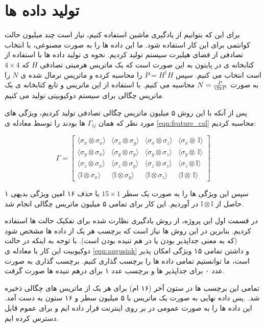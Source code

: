 \section{تولید داده ها}

برای این که بتوانیم از یادگیری ماشین استفاده کنیم، نیاز است چند میلیون حالت کوانتمی برای این کار استفاده شود.
ما این داده ها را به صورت مصنوعی، با انتخاب تصادفی از فضای هیلبرت سیستم تولید کردیم.
نحوه ی تولید داده ها با استفاده از کتابخانه ی
در پایتون به این صورت است که
یک ماتریس هرمیتی
تصادفی
$H$
که
$4\times 4$
است
انتخاب می کنیم. سپس
$P=H^\dag H$
را محاسبه کرده و ماتریس نرمال شده ی
$N$
را به صورت
$N = \frac{P}{\Tr P}$
محاسبه می کنیم.
با استفاده از این ماتریس و تابع
کتابخانه ی
یک ماتریس چگالی برای سیستم دوکیوبیتی تولید می کنیم.

پس از آنکه با این روش ۵ میلیون ماتریس چگالی تصادفی تولید کردیم، ویژگی های مورد نظر که همان
$\Gamma_{ij}$
ها بودند را توسط معادله ی
\ref{eqn:feature_cal}
محاسبه کردیم:

\[
   \Gamma =
  \left[ {\begin{array}{cccc}
\langle\sigma_x\otimes\sigma_x\rangle & \langle\sigma_x\otimes\sigma_y\rangle & \langle\sigma_x\otimes\sigma_z\rangle & \langle\sigma_x\otimes\ \mathbb{I}\rangle
\\ \langle\sigma_y\otimes\sigma_x\rangle & \langle\sigma_y\otimes\sigma_y\rangle & \langle\sigma_y\otimes\sigma_z\rangle & \langle\sigma_y\otimes\ \mathbb{I}\rangle
\\ \langle\sigma_z\otimes\sigma_x\rangle & \langle\sigma_z\otimes\sigma_y\rangle & \langle\sigma_z\otimes\sigma_z\rangle & \langle\sigma_z\otimes \mathbb{I}\rangle
\\ \langle\mathbb{I}\otimes\sigma_x\rangle & \langle\mathbb{I}\otimes\sigma_y\rangle & \langle\mathbb{I}\otimes\sigma_z\rangle &    \langle\mathbb{I}\otimes\ \mathbb{I}\rangle
  \end{array} } \right]
\]


سپس این ويژگی ها را به صورت یک سطر
$15 \times 1$
با حذف ۱۶ امین ویژگی بدیهی ۱ حاصل از
$ \mathbb{I} \otimes \mathbb{I}$
در آوردیم. این کار برای تمامی ۵ میلیون ماتریس چگالی انجام شد.

در قسمت اول این پروژه، از روش یادگیری نظارت شده برای تفکیک حالت ها استفاده کردیم. بنابرین در این روش ها نیاز است که برچسب
هر یک از داده ها مشخص شود (که به معنی جداپذیر بودن یا در هم تنیده بودن است).
با توجه به اینکه در حالت دوکیوبیت این کار با معادله ی
\ref{eqn:augusiak}
و داشتن تمامی ۱۵ ویژگی امکان پذیر است، ما توانستیم تمامی داده ها را برچسب گذاری کنیم.
برچسب گذاری به صورت عدد ۰ برای جداپذیر ها و برچسب عدد ۱ برای درهم تنیده ها صورت گرفت.

تمامی این برچسب ها در ستون آخر (۱۶ ام) برای هر یک از ماتریس های چگالی ذخیره شد.
.پس داده نهایی به صورت یک ماتریس با ۵ میلیون سطر و ۱۶ ستون به دست آمد.
این داده ها را به صورت عمومی در
بر روی اینترنت
قرار داده ایم و برای عموم قابل دسترس کرده ایم.
